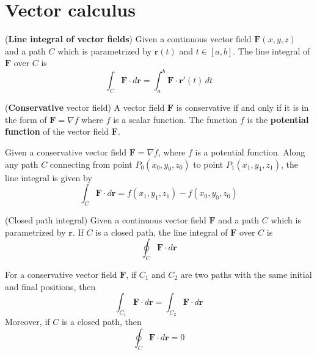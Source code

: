 \documentclass{huhtakm-template-book}
\begin{document}
\chapter{Vector calculus}
\begin{defn}(\textbf{Line integral of vector fields})
    Given a continuous vector field $\mathbf{F}(x,y,z)$ and a path $C$ which is parametrized by $\mathbf{r}(t)$ and $t\in[a,b]$. The line integral of $\mathbf{F}$ over $C$ is
    \begin{equation*}
        \int_{C}\mathbf{F}\cdot d\mathbf{r}=\int_{a}^{b}\mathbf{F}\cdot\mathbf{r}'(t)\,dt
    \end{equation*}
\end{defn}
\begin{defn}(\textbf{Conservative} vector field)
    A vector field $\mathbf{F}$ is conservative if and only if it is in the form of $\mathbf{F}=\nabla f$ where $f$ is a scalar function. The function $f$ is the \textbf{potential function} of the vector field $\mathbf{F}$.
\end{defn}
\begin{thm}
    Given a conservative vector field $\mathbf{F}=\nabla f$, where $f$ is a potential function. Along any path $C$ connecting from point $P_{0}(x_{0},y_{0},z_{0})$ to point $P_{1}(x_{1},y_{1},z_{1})$, the line integral is given by
    \begin{equation*}
        \int_{C}\mathbf{F}\cdot d\mathbf{r}=f(x_{1},y_{1},z_{1})-f(x_{0},y_{0},z_{0})
    \end{equation*}
\end{thm}
\begin{defn}(Closed path integral)
    Given a continuous vector field $\mathbf{F}$ and a path $C$ which is parametrized by $\mathbf{r}$. If $C$ is a closed path, the line integral of $\mathbf{F}$ over $C$ is
    \begin{equation*}
        \oint_{C}\mathbf{F}\cdot d\mathbf{r}
    \end{equation*}
\end{defn}
\begin{cor}
    For a conservative vector field $\mathbf{F}$, if $C_{1}$ and $C_{2}$ are two paths with the same initial and final positions, then
    \begin{equation*}
        \int_{C_{1}}\mathbf{F}\cdot d\mathbf{r}=\int_{C_{2}}\mathbf{F}\cdot d\mathbf{r}
    \end{equation*}
    Moreover, if $C$ is a closed path, then
    \begin{equation*}
        \oint_{C}\mathbf{F}\cdot d\mathbf{r}=0
    \end{equation*}
\end{cor}
\end{document}
